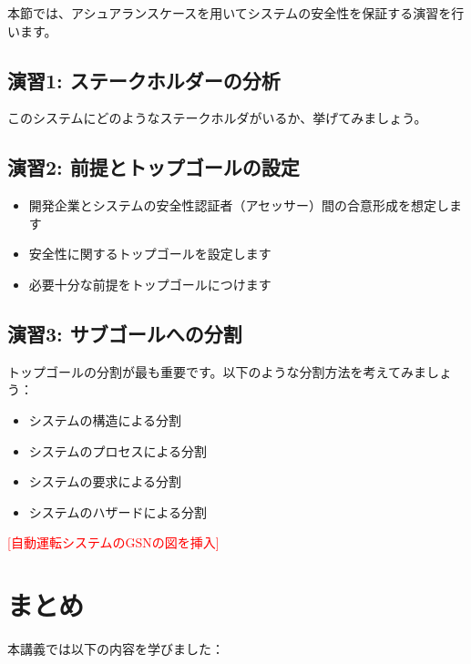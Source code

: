本節では、アシュアランスケースを用いてシステムの安全性を保証する演習を行います。

\subsection{演習1: ステークホルダーの分析}
このシステムにどのようなステークホルダがいるか、挙げてみましょう。

\subsection{演習2: 前提とトップゴールの設定}
\begin{itemize}
    \item 開発企業とシステムの安全性認証者（アセッサー）間の合意形成を想定します
    \item 安全性に関するトップゴールを設定します
    \item 必要十分な前提をトップゴールにつけます
\end{itemize}

\subsection{演習3: サブゴールへの分割}
トップゴールの分割が最も重要です。以下のような分割方法を考えてみましょう：
\begin{itemize}
    \item システムの構造による分割
    \item システムのプロセスによる分割
    \item システムの要求による分割
    \item システムのハザードによる分割
\end{itemize}

\textcolor{red}{[自動運転システムのGSNの図を挿入]}

\section{まとめ}

本講義では以下の内容を学びました：

